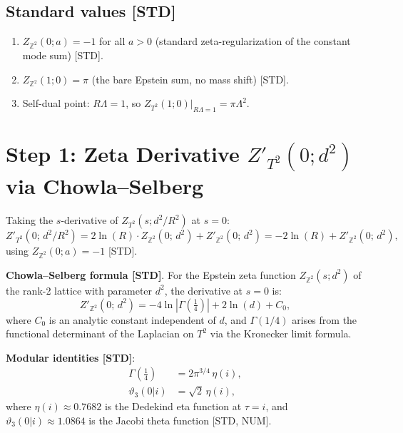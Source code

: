 \documentclass[12pt,a4paper]{article}
\begin{document}
\subsection*{Standard values [STD]}

\begin{enumerate}
\item $Z_{\mathbb{Z}^2}(0; a) = -1$ for all $a > 0$
      (standard zeta-regularization of the constant mode sum) [STD].
\item $Z_{\mathbb{Z}^2}(1; 0) = \pi$ (the bare Epstein sum, no mass shift) [STD].
\item Self-dual point: $R\Lambda = 1$, so $Z_{T^2}(1; 0)|_{R\Lambda=1} = \pi\Lambda^2$.
\end{enumerate}

\section{Step 1: Zeta Derivative $Z'_{T^2}(0; d^2)$ via Chowla--Selberg}
\label{sec:step1}

Taking the $s$-derivative of $Z_{T^2}(s; d^2/R^2)$ at $s = 0$:
\begin{equation}
Z'_{T^2}(0;\, d^2/R^2)
= 2\ln(R)\cdot Z_{\mathbb{Z}^2}(0;\, d^2)
  + Z'_{\mathbb{Z}^2}(0;\, d^2)
= -2\ln(R) + Z'_{\mathbb{Z}^2}(0;\, d^2),
\label{eq:zt2_deriv}
\end{equation}
using $Z_{\mathbb{Z}^2}(0; a) = -1$ [STD].

\medskip\noindent
\textbf{Chowla--Selberg formula [STD]}.
For the Epstein zeta function $Z_{\mathbb{Z}^2}(s; d^2)$ of the
rank-2 lattice with parameter $d^2$, the derivative at $s = 0$ is:
\begin{equation}
Z'_{\mathbb{Z}^2}(0;\, d^2) = -4\ln|\Gamma({\tfrac{1}{4}})| + 2\ln(d) + C_0,
\label{eq:cs_deriv}
\end{equation}
where $C_0$ is an analytic constant independent of $d$, and
$\Gamma(1/4)$ arises from the functional determinant of the Laplacian on $T^2$
via the Kronecker limit formula.

\medskip\noindent
\textbf{Modular identities [STD]}:
\begin{align}
\Gamma({\tfrac{1}{4}}) &= 2\pi^{3/4}\,\eta(i),
  \label{eq:gamma14_eta}\\
\vartheta_3(0|i) &= \sqrt{2}\,\eta(i),
  \label{eq:theta3_eta}
\end{align}
where $\eta(i) \approx 0.7682$ is the Dedekind eta function at $\tau = i$,
and $\vartheta_3(0|i) \approx 1.0864$ is the Jacobi theta function [STD, NUM].
\end{document}

